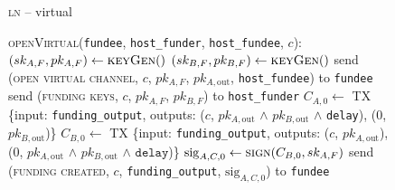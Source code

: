 \begin{figure}[H]
  \begin{processbox}{\textsc{ln} -- virtual}
    \begin{algorithmic}[1]
      \State \textsc{openVirtual}(\texttt{fundee}, \texttt{host\_funder},
      \texttt{host\_fundee}, $c$):
      \Indent
        \State $(sk_{A, F}, pk_{A, F}) \gets \textsc{keyGen}()$
          \State $(sk_{B, F}, pk_{B, F}) \gets \textsc{keyGen}()$
        \Else \: 
          \State send (\textsc{open virtual channel}, $c$, $pk_{A, F}$, $pk_{A,
          \mathrm{out}}$, \texttt{host\_fundee}) to \texttt{fundee}
          \State {}
          \State {}
          \State {}
          \State {}
          \State {}
        \EndIf
        \State send (\textsc{funding keys}, $c$, $pk_{A, F}$, $pk_{B, F}$) to
        \texttt{host\_funder}
        \State {} 
        \State {}
          \State $C_{A, 0} \gets$ TX \{input: \texttt{funding\_output}, outputs:
          ($c$, $pk_{A, \mathrm{out}}$ $\wedge$ $pk_{B, \mathrm{out}}$ $\wedge$
          \texttt{delay}), ($0$, $pk_{B, \mathrm{out}}$)\}
          \State $C_{B, 0} \gets$ TX \{input: \texttt{funding\_output}, outputs:
          ($c$, $pk_{A, \mathrm{out}}$), ($0$, $pk_{A, \mathrm{out}}$ $\wedge$
          $pk_{B, \mathrm{out}}$ $\wedge$ $\texttt{delay}$)\}
          \State $\mathrm{sig}_{A, C, 0} \gets \textsc{sign}(C_{B, 0}, sk_{A,
          F})$
          \State send (\textsc{funding created}, $c$, \texttt{funding\_output},
          $\mathrm{sig}_{A, C, 0}$) to \texttt{fundee}
          \State {}
          \State {}
\end{algorithmic}
\end{processbox}
\end{figure}
